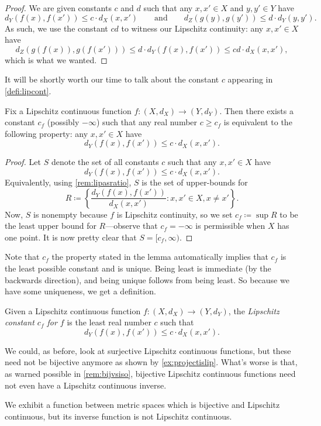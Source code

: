 \documentclass[../notes.tex]{subfiles}
\begin{document}
\begin{proof}
	We are given constants $c$ and $d$ such that any $x,x'\in X$ and $y,y'\in Y$ have
	\[d_Y(f(x),f(x'))\le c\cdot d_X(x,x')\qquad\text{and}\qquad d_Z(g(y),g(y'))\le d\cdot d_Y(y,y').\]
	As such, we use the constant $cd$ to witness our Lipschitz continuity: any $x,x'\in X$ have
	\[d_Z(g(f(x)),g(f(x')))\le d\cdot d_Y(f(x),f(x'))\le cd\cdot d_X(x,x'),\]
	which is what we wanted.
\end{proof}
It will be shortly worth our time to talk about the constant $c$ appearing in \autoref{defi:lipcont}.
\begin{lemma} \label{lem:getlipconst}
	Fix a Lipschitz continuous function $f\colon(X,d_X)\to(Y,d_Y)$. Then there exists a constant $c_f$ (possibly $-\infty$) such that any real number $c\ge c_f$ is equivalent to the following property: any $x,x'\in X$ have
	\[d_Y(f(x),f(x'))\le c\cdot d_X(x,x').\]
\end{lemma}
\begin{proof}
	Let $S$ denote the set of all constants $c$ such that any $x,x'\in X$ have
	\[d_Y(f(x),f(x'))\le c\cdot d_X(x,x').\]
	Equivalently, using \autoref{rem:lipasratio}, $S$ is the set of upper-bounds for
	\[R\coloneqq\left\{\frac{d_Y(f(x),f(x'))}{d_X(x,x')}:x,x'\in X,x\ne x'\right\}.\]
	Now, $S$ is nonempty because $f$ is Lipschitz continuity, so we set $c_f\coloneqq\sup R$ to be the least upper bound for $R$---observe that $c_f=-\infty$ is permissible when $X$ has one point. It is now pretty clear that $S=[c_f,\infty)$.
\end{proof}
Note that $c_f$ the property stated in the lemma automatically implies that $c_f$ is the least possible constant and is unique. Being least is immediate (by the backwards direction), and being unique follows from being least. So because we have some uniqueness, we get a definition.
\begin{defihelper} 
	Given a Lipschitz continuous function $f\colon(X,d_X)\to(Y,d_Y)$, the \textit{Lipschitz constant $c_f$ for $f$} is the least real number $c$ such that
	\[d_Y(f(x),f(x'))\le c\cdot d_X(x,x').\]
\end{defihelper}
We could, as before, look at surjective Lipschitz continuous functions, but these need not be bijective anymore as shown by \autoref{ex:projectislip}. What's worse is that, as warned possible in \autoref{rem:bijvsiso}, bijective Lipschitz continuous functions need not even have a Lipschitz continuous inverse.
\begin{exe} \label{exe:sadbijlip}
	We exhibit a function between metric spaces which is bijective and Lipschitz continuous, but its inverse function is not Lipschitz continuous.
\end{exe}
\end{document}

